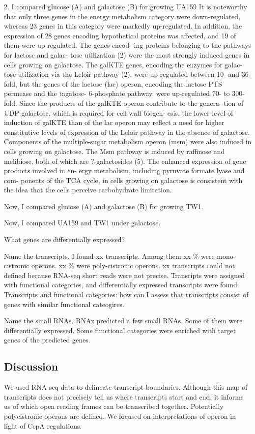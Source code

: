 \documentclass{article}
\begin{document}
2. I compared glucose (A) and galactose (B) for growing UA159
It is noteworthy that only three genes in the energy metabolism category were
down-regulated, whereas 23 genes in this category were markedly up-regulated. In
addition, the expression of 28 genes encoding hypothetical proteins was affected,
and 19 of them were up-regulated. The genes encod- ing proteins belonging to the
pathways for lactose and galac- tose utilization (2) were the most strongly
induced genes in cells growing on galactose. The galKTE genes, encoding the
enzymes for galac- tose utilization via the Leloir pathway (2), were
up-regulated between 10- and 36-fold, but the genes of the lactose (lac) operon,
encoding the lactose PTS permease and the tagatose- 6-phosphate pathway, were
up-regulated 70- to 300-fold. Since the products of the galKTE operon contribute
to the genera- tion of UDP-galactose, which is required for cell wall biogen-
esis, the lower level of induction of galKTE than of the lac operon may reflect
a need for higher constitutive levels of expression of the Leloir pathway in the
absence of galactose. Components of the multiple-sugar metabolism operon (msm)
were also induced in cells growing on galactose. The Msm pathway is induced by
raffinose and melibiose, both of which are ?-galactosides (5). The enhanced
expression of gene products involved in en- ergy metabolism, including pyruvate
formate lyase and com- ponents of the TCA cycle, in cells growing on galactose
is consistent with the idea that the cells perceive carbohydrate limitation. 

Now, I compared glucose (A) and galactose (B) for growing TW1. 

Now, I compared UA159 and TW1 under galactose. 

What genes are differentially expressed? 

Name the transcripts.
I found xx transcripts. Among them xx \% were mono-cistronic operons. xx \% were
poly-cistronic operons. xx transcripts could not defined because RNA-seq short
reads were not precise. Transripts were assigned with functional categories, and
differentially expressed transcripts were found. Transcripts and functional
categories: how can I assess that transcripts consist of genes with similar
functional cateogires. 

Name the small RNAs.
RNAz predicted a few small RNAs. Some of them were differentially expressed.
Some functional categories were enriched with target genes of the predicted
genes. 

\subsection{Discussion}
We used RNA-seq data to delineate transcript boundaries. Although this map of
transcripts does not precisely tell us where transcripts start and end, it
informs us of which open reading frames can be transcribed together. Potentially
polycistronic operons are defined. We focused on interpretations of operon in
light of CcpA regulations. 
\end{document}
